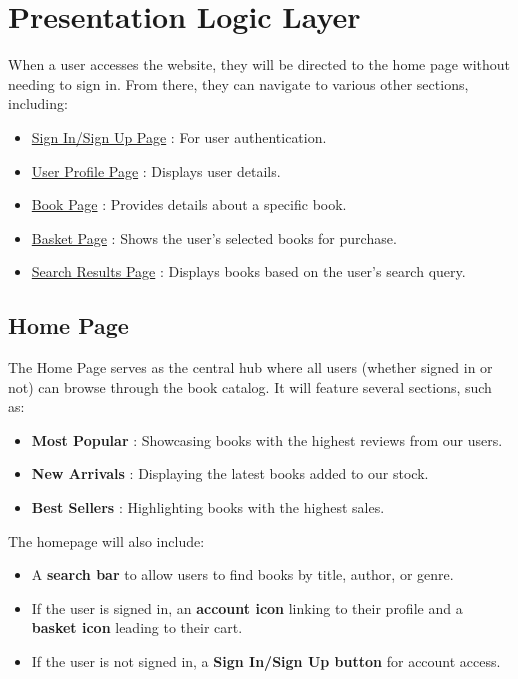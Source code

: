\section{Presentation Logic Layer}
When a user accesses the website, they will be directed to the home page without needing to sign in. From there, they can navigate to various other sections, including:
\begin{itemize}
    \item \hyperref[sec:signin]{Sign In/Sign Up Page} : For user authentication.
    \item \hyperref[sec:profile]{User Profile Page} : Displays user details.
    \item \hyperref[sec:book]{Book Page} : Provides details about a specific book.
    \item \hyperref[sec:basket]{Basket Page} : Shows the user's selected books for purchase.
    \item \hyperref[sec:search]{Search Results Page} : Displays books based on the user’s search query.
\end{itemize}

\subsection{Home Page}
The Home Page serves as the central hub where all users (whether signed in or not) can browse through the book catalog. It will feature several sections, such as:
\begin{itemize}
    \item \textbf{Most Popular} : Showcasing books with the highest reviews from our users.
    \item \textbf{New Arrivals} : Displaying the latest books added to our stock.
    \item \textbf{Best Sellers} : Highlighting books with the highest sales.
\end{itemize}

The homepage will also include:
\begin{itemize}
    \item A \textbf{search bar} to allow users to find books by title, author, or genre.
    \item If the user is signed in, an \textbf{account icon} linking to their profile and a \textbf{basket icon} leading to their cart.
    \item If the user is not signed in, a \textbf{Sign In/Sign Up button} for account access.
\end{itemize}

